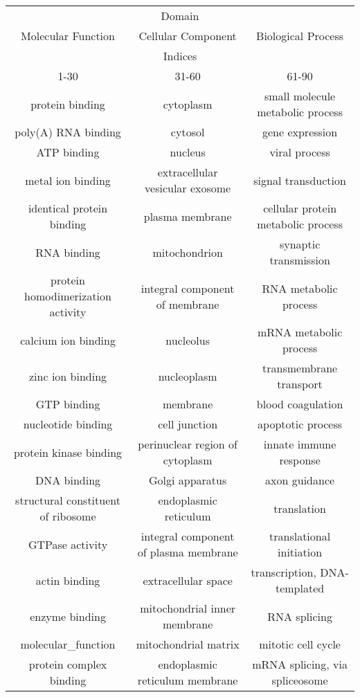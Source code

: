 \begin{table}
    \centering
    \begin{tabular}{c c c}
        \multicolumn{3}{c}{Domain} \\
        Molecular Function & Cellular Component & Biological Process \\
        \multicolumn{3}{c}{Indices} \\
        1-30        & 31-60     & 61-90 \\
        \hline
        protein binding & cytoplasm & small molecule metabolic process \\
        poly(A) RNA binding & cytosol & gene expression \\
        ATP binding & nucleus & viral process \\
        metal ion binding & extracellular vesicular exosome & signal transduction \\
        identical protein binding & plasma membrane & cellular protein metabolic process \\
        RNA binding & mitochondrion & synaptic transmission \\
        protein homodimerization activity & integral component of membrane & RNA metabolic process \\
        calcium ion binding & nucleolus & mRNA metabolic process \\
        zinc ion binding & nucleoplasm & transmembrane transport \\
        GTP binding & membrane & blood coagulation \\
        nucleotide binding & cell junction & apoptotic process \\
        protein kinase binding & perinuclear region of cytoplasm & innate immune response \\
        DNA binding & Golgi apparatus & axon guidance \\
        structural constituent of ribosome & endoplasmic reticulum & translation \\
        GTPase activity & integral component of plasma membrane & translational initiation \\
        actin binding & extracellular space & transcription, DNA-templated \\
        enzyme binding & mitochondrial inner membrane & RNA splicing \\
        molecular_function & mitochondrial matrix & mitotic cell cycle \\
        protein complex binding & endoplasmic reticulum membrane & mRNA splicing, via spliceosome \\

\end{tabular}
\end{table}
